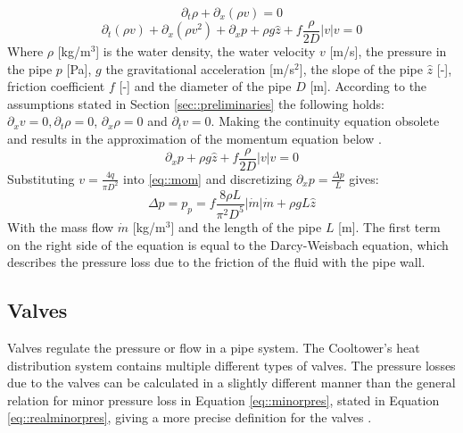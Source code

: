 \begin{equation}
\partial_t \rho+\partial_x\left(\rho v\right)=0
\end{equation}
\begin{equation}
\partial_t (\rho v)+\partial_x(\rho v^2)+ \partial_x p+\rho g \hat{z}  +f \frac{\rho}{2 D}|v| v=0
\end{equation}
Where $\rho$ [kg/m$^3$] is the water density, the water velocity $v$ [m/s], the pressure in the pipe $p$ [Pa], $g$ the gravitational acceleration [m/s$^2$], the slope of the pipe $\hat{z}$ [-], friction coefficient $f$ [-] and the diameter of the pipe $D$ [m]. According to the assumptions stated in Section \ref{sec::preliminaries} the following holds: $\partial_x v = 0, \partial_t \rho = 0$, $\partial_x \rho = 0$ and $\partial_t v = 0$. Making the continuity equation obsolete and results in the approximation of the momentum equation below \cite{sibeijn2025economic}. 
\begin{equation}\label{eq::mom}
\partial_x p + \rho g \hat{z} +f \frac{\rho}{2 D}\left|v\right| v=0
\end{equation}
Substituting $v = \frac{4 q}{\pi D^2}$ into \eqref{eq::mom} and discretizing $\partial_x p = \frac{\Delta p}{L}$ gives:
\begin{equation}
    \Delta p = p_{p} =  f \frac{8\rho L}{\pi^2 D^5}\left|\dot{m}\right| \dot{m} + \rho g L \hat{z}
\end{equation}
With the mass flow $\dot{m}$ [kg/m$^3$] and the length of the pipe $L$ [m]. The first term on the right side of the equation is equal to the Darcy-Weisbach equation, which describes the pressure loss due to the friction of the fluid with the pipe wall.  




\subsection{Valves}\label{sec::valves}
Valves regulate the pressure or flow in a pipe system. The Cooltower's heat distribution system contains multiple different types of valves. The pressure losses due to the valves can be calculated in a slightly different manner than the general relation for minor pressure loss in Equation \ref{eq::minorpres}, stated in Equation \ref{eq::realminorpres}, giving a more precise definition for the valves \cite{Artikelphdchris}. 

